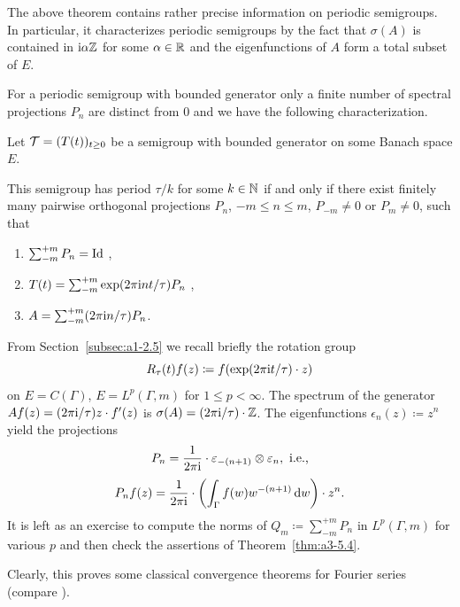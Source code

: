 The above theorem contains rather precise information on periodic semigroups.
In particular, it characterizes periodic semigroups by the fact that $\sigma(A)$ is contained in $\mathrm{i}\alpha\mathbb{Z}$ for some $\alpha \in \mathbb{R}$ and the eigenfunctions of\/ $A$ form a total subset of\/ $E$.

For a periodic semigroup with bounded generator
only a finite number of spectral projections $P_{n}$ are distinct from $0$ and we have the following characterization.
\begin{corollary}\label{cor:a3-5.5}
Let $\TT = (T(t))_{t \geq 0}$ be a semigroup with bounded generator on some Banach space $E$.

This semigroup has period $\tau/k$ for some $k \in \mathbb{N}$ if and only if there exist finitely many pairwise orthogonal projections $P_{n}$, $-m \leq n \leq m$, $P_{-m} \neq 0$ or $P_{m} \neq 0$, such that
\begin{enumerate}[\upshape (i)]
\item 
$\sum_{-m}^{+m} P_{n} =  \operatorname{Id}$ ,

\item 
$T(t) = \sum_{-m}^{+m} \exp(2\pi\mathrm{i} nt/\tau)P_{n}$ ,

\item 
$A = \sum_{-m}^{+m} (2\pi\mathrm{i} n/\tau)P_{n}$. 

\end{enumerate}
\end{corollary}
\begin{example}\label{ex:a3-5.6} 
From Section~\ref{subsec:a1-2.5} we recall briefly the rotation group
\[
R_{\tau}(t)f(z) \coloneq f(\exp(2\pi\mathrm{i} t/\tau) \cdot z)
\]
on $E = C(\Gamma)$, \resp $E = L^{p}(\Gamma,m)$ for $1 \leq p < \infty$.
The spectrum of the generator\quad
$Af(z) = (2\pi\mathrm{i} /\tau)z \cdot f'(z)$\quad
is \quad $\sigma(A) = (2\pi\mathrm{i} /\tau) \cdot\mathbb{Z}$.
The eigenfunctions $\epsilon_{n}(z) \coloneq z^{n}$ yield the projections
\[
P_{n} = \frac{1}{2\pi \iu} \cdot\epsilon_{-(n+1)} \otimes \epsilon_{n}, \text{ \ie }
\]
\[
P_{n}f(z) = \frac{1}{2\pi \mathrm{i}}  \cdot \left( \int_{\Gamma} f(w)w^{-(n+1)} \mathop{}\!\mathrm{d}{w} \right)\cdot z^{n} .
\]
It is left as an exercise to compute the norms of\/ $Q_{m} \coloneq \sum_{-m}^{+m} P_{n}$ in $L^{p}(\Gamma,m)$ for various $p$ and then check the assertions of Theorem~\ref{thm:a3-5.4}.

Clearly, this proves some classical convergence theorems for Fourier series (compare \textcite[Chap.8.1]{davies:1980}).
\end{example}

